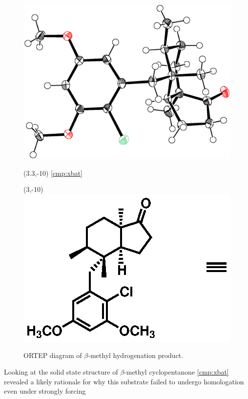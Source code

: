 \begin{figure}[h]
  \centering
  \includegraphics[scale=0.4, trim = 10mm 0mm 15mm -125mm,
clip,
  angle=92]{chp_singlecarbon/images/betamethylcrystal}
    \begin{textblock}{1}(3.3,-10) \textsf{\scriptsize{\ref{cmp:xbat}}} \end{textblock}
   \begin{textblock}{1}(3,-10)
  \includegraphics[scale=0.8]{chp_singlecarbon/images/betamethylstructure}
  \end{textblock}
  \caption{ORTEP diagram of $\beta$-methyl hydrogenation product.}
  \label{fig:betamethylcrystal}
\end{figure}
Looking at the solid state structure of $\beta$-methyl cyclopentanone \ref{cmp:xbat} revealed a
likely rationale for why this substrate failed to undergo homologation even under strongly forcing
